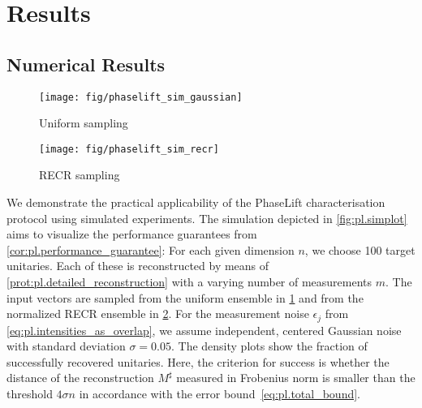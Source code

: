 \section{Results}%
\label{sec:pl.results}

\subsection{Numerical Results}%
\label{sub:pl.results.numerics}

\begin{figure*}[tbp]
  \begin{subfigure}{.475\columnwidth}
    \texttt{[image: fig/phaselift\_sim\_gaussian]}
    \caption{\label{sfig:pl.simplot.gaussian}%
      Uniform sampling
    }
   \end{subfigure}
  \begin{subfigure}{.475\columnwidth}
    \texttt{[image: fig/phaselift\_sim\_recr]}
    \caption{\label{sfig:pl.simplot.recr}%
      RECR sampling
    }
   \end{subfigure}
  \caption{\label{fig:pl.simplot}%
    Simulated recovery-probability using the two different sampling schemes under noisy measurements with $\sigma = 0.05$.
    For each given dimension, the transfer matrices to be recovered consist of 97 Haar random unitaries as well as the identity, the swap-matrix, and the discrete Fourier transform.
    The red line indicates the conjectured phase transition at $4 n - 4$.
  }
\end{figure*}

We demonstrate the practical applicability of the PhaseLift characterisation protocol using simulated experiments.
The simulation depicted in \cref{fig:pl.simplot} aims to visualize the performance guarantees from \cref{cor:pl.performance_guarantee}:
For each given dimension $n$, we choose 100 target unitaries.
Each of these is reconstructed by means of \cref{prot:pl.detailed_reconstruction} with a varying number of measurements $m$.
The input vectors are sampled from the uniform ensemble in \cref{sfig:pl.simplot.gaussian} and from the normalized RECR ensemble in \cref{sfig:pl.simplot.recr}.
For the measurement noise $\epsilon_j$ from \cref{eq:pl.intensities_as_overlap}, we assume independent, centered Gaussian noise with standard deviation $\sigma = 0.05$.
The density plots show the fraction of successfully recovered unitaries.
Here, the criterion for success is whether the distance of the reconstruction $M^\sharp$ measured in Frobenius norm is smaller than the threshold  $4 \sigma n$ in accordance with the error bound~\eqref{eq:pl.total_bound}.

